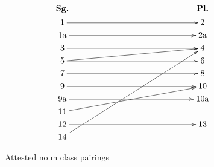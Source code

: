 \begin{figure}[h]
	\begin{center}
		\begin{displaymath}
		\xymatrix@R=2.75pt@C=2in{    %
			\textbf{Sg.}            &    \textbf{Pl.}\\
			1    \ar[r] 		        &    2\\
			1\textrm{a}   \ar[r]                &    2\textrm{a}\\
			3    \ar[r]                 &    4\\
			5    \ar[r]\ar[ur]          &    6 \\
			7    \ar[r]                 &    8\\
			9    \ar[r] 		        &    10\\
			9\textrm{a}	 \ar[r]         &    10\textrm{a}\\
			11    \ar[uur]	 		     &    \\
			12    \ar[r]                &    13\\
			14    \ar[uuuuuuur]            &    \\
		}
		\end{displaymath}
		\caption{Attested noun class pairings}\label{FIGattestedsgplpairings}
	\end{center}
\end{figure}

